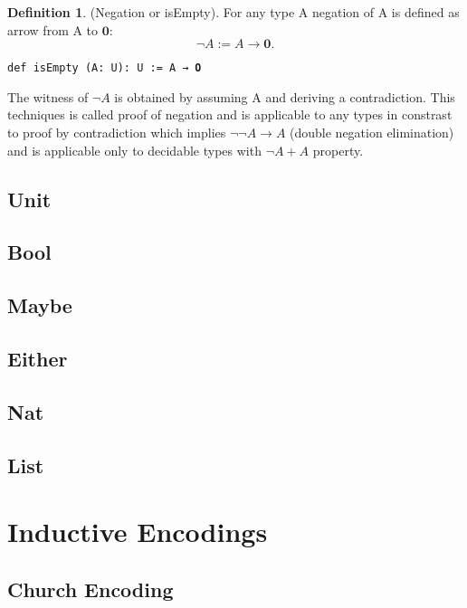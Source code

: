 \documentclass{article}
\theoremstyle{definition}
\newtheorem{definition}{Definition}
\begin{document}
\begin{definition} (Negation or isEmpty).
For any type A negation of A is defined as arrow from A to $\mathbf{0}$:
$$
  \neg A := A \rightarrow \mathbf{0}.
$$
\begin{lstlisting}
def isEmpty (A: U): U := A → 𝟎
\end{lstlisting}
\end{definition}

The witness of $\neg A$ is obtained by assuming A and deriving a contradiction.
This techniques is called proof of negation and is applicable to any types in constrast
to proof by contradiction which implies $\neg\neg A \rightarrow A$ (double negation elimination) and is
applicable only to decidable types with $\neg A + A$ property.

\newpage
\subsection{Unit}

\subsection{Bool}

\subsection{Maybe}

\subsection{Either}

\subsection{Nat}

\subsection{List}

\newpage
\section{Inductive Encodings}

\subsection{Church Encoding}
\end{document}
